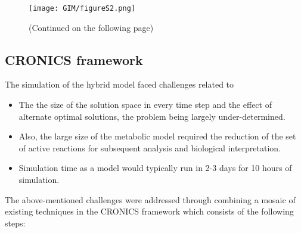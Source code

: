 \begin{figure}[!htp]
\centering
	\texttt{[image: GIM/figureS2.png]}%
	\caption[Gene expression constraints pipeline.]{(Continued on the following page)}
	\label{fig:s2GIM}
\end{figure}
\begin{figure}[t]
\end{figure}
\subsection{CRONICS framework} \label{GIM:sp3}
The simulation of the hybrid model faced challenges related to 
\begin{itemize}
\item	The the size of the solution space in every time step and the effect of alternate optimal solutions, the problem being largely under-determined.  
\item	Also, the large size of the metabolic model required the reduction of the set of active reactions for subsequent analysis and biological interpretation. 
\item	Simulation time as a model would typically run in 2-3 days for 10 hours of simulation.
\end{itemize}
The above-mentioned challenges were addressed through combining a mosaic of existing techniques in the CRONICS framework which consists of the following steps:\\

